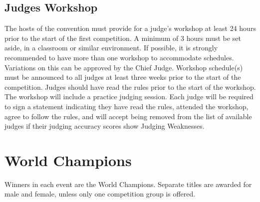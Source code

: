 \subsection{Judges Workshop}
The hosts of the convention must provide for a judge’s workshop at least 24 hours prior to the start of the first competition. A minimum of 3 hours must be set aside, in a classroom or similar environment. If possible, it is strongly recommended to have more than one workshop to accommodate schedules. Variations on this can be approved by the Chief Judge. Workshop schedule(s) must be announced to all judges at least three weeks prior to the start of the competition. Judges should have read the rules prior to the start of the workshop. The workshop will include a practice judging session. Each judge will be required to sign a statement indicating they have read the rules, attended the workshop, agree to follow the rules, and will accept being removed from the list of available judges if their judging accuracy scores show Judging Weaknesses.
\section{World Champions}
Winners in each event are the World Champions. Separate titles are awarded for male and female, unless only one competition group is offered.
